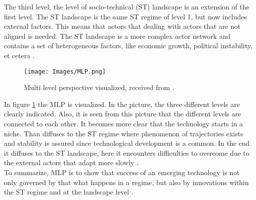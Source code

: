 The third level, the level of socio-technical (ST) landscape is an extension of the first level. The ST landscape is the same ST regime of level 1, but now includes external factors. This means that actors that dealing with actors that are not aligned is needed. The ST landscape is a more complex actor network and contains a set of heterogeneous factors, like economic growth, political instability, et cetera \citep{Geels2002}.

\begin{figure}[H]
    \centering
    \texttt{[image: Images/MLP.png]}
    \caption{Multi level perspective visualized, received from \citep{Geels2002}.}
    \label{fig:MLP}
\end{figure}
In figure \ref{fig:MLP} the MLP is visualized. In the picture, the three different levels are clearly indicated. Also, it is seen from this picture that the different levels are connected to each other. It becomes more clear that the technology starts in a niche. Than diffuses to the ST regime where phenomenon of trajectories exists and stability is assured since technological development is a common. In the end it diffuses to the ST landscape, here it encounters difficulties to overcome due to the external actors that adapt more slowly \citep{Geels2002}. \\
To summarize, MLP is to show that success of an emerging technology is not only governed by that what happens in a regime, but also by innovations within the ST regime and at the landscape level \citep{Geels2002}.
